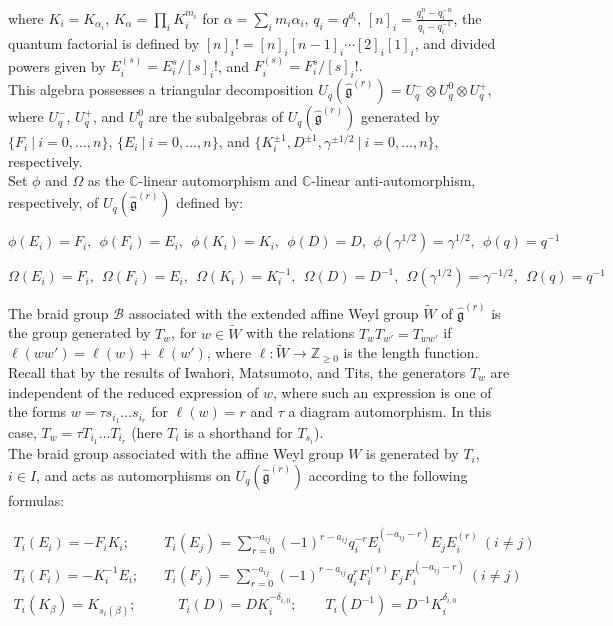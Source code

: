 \documentclass[12pt]{amsart}
\numberwithin{equation}{section}
\newcommand{\Z}{\ensuremath{\mathbb{Z}}}
\newcommand{\C}{\ensuremath{\mathbb{C}}}
\newcommand{\g}{\ensuremath{\mathfrak{g}}}
\newcommand{\mc}[1]{\mathcal{#1}}
\begin{document}
where $K_i=K_{\alpha_i}$, $K_{\alpha} = \prod_i K_i^{m_i}$ for $\alpha = \sum_i m_i\alpha_i$, $q_i = q^{d_i}$, $[n]_i=\frac{q_i^n - q_i^{-n}}{q_i-q_i^{-1}}$, the quantum factorial is defined by $[n]_i!=[n]_i[n-1]_i\cdots [2]_i[1]_i$, and divided powers given by $E_i^{(s)} = E_i^{s}/[s]_i!$, and $F_i^{(s)} = F_i^{s}/[s]_i!.$\\ 

This algebra possesses a triangular decomposition $U_q(\hat{\g}^{(r)}) = U_q^{-}\otimes U_q^0 \otimes U_q^{+}$, where $U_q^{-}$, $U_q^{+}$, and $U_q^0$ are the subalgebras of $U_q(\hat{\g}^{(r)})$ generated by $\{F_i \ |\ i=0, \ldots, n\}$, $\{E_i \ |\ i=0, \ldots, n\}$, and $\{K_i^{\pm 1}, D^{\pm 1}, \gamma^{\pm 1/2} \ |\ i=0, \ldots, n\}$, respectively. \\

Set $\phi$ and $\Omega$ as the $\C$-linear automorphism and $\C$-linear anti-automorphism, respectively, of $U_q(\hat{\g}^{(r)})$ defined by: 

$$ \phi(E_i) = F_i, \ \ \phi(F_i) = E_i, \ \ \phi(K_i) = K_i, \ \ \phi(D) = D,\ \, \phi(\gamma^{1/2}) = \gamma^{1/2}, \ \ \phi(q) = q^{-1}$$

$$ \Omega(E_i) = F_i, \ \ \Omega(F_i) = E_i, \ \ \Omega(K_i) = K_i^{-1}, \ \ \Omega(D) = D^{-1}, \ \ \Omega(\gamma^{1/2}) = \gamma^{-1/2}, \ \  \Omega(q) = q^{-1}$$

\vspace{3mm}

The braid group $\mc{B}$ associated with the extended affine Weyl group $\tilde{W}$ of $\hat{\g}^{(r)}$ is the group generated by $T_w$, for $w \in \tilde{W}$ with the relations $T_{w}T_{w'} = T_{ww'}$ if $\ell(ww') = \ell(w) + \ell(w')$, where $\ell : \tilde{W} \to \Z_{\geq 0}$ is the length function. Recall that by the results of Iwahori, Matsumoto, and Tits, the generators $T_w$ are independent of the reduced expression of $w$, where such an expression is one of the forms $w=\tau s_{i_1}\ldots s_{i_r}$ for $\ell(w)=r$ and $\tau$ a diagram automorphism. In this case, $T_w = \tau T_{i_1}\ldots T_{i_r}$ (here $T_{i}$ is a shorthand for $T_{s_i}$).\\

The braid group associated with the affine Weyl group $W$ is generated by $T_i$, $i\in I$, and acts as automorphisms on $U_q(\hat{\g}^{(r)})$ according to the following formulas: 

\begin{align*}
    T_i(E_i) = -F_iK_i; & \quad T_i(E_j) = \sum_{r=0}^{-a_{ij}} (-1)^{r-a_{ij}}q_i^{-r} E_i^{(-a_{ij}-r)}E_jE_i^{(r)} \ (i\neq j) \\
    T_i(F_i) = -K_i^{-1}E_i; & \quad T_i(F_j) = \sum_{r=0}^{-a_{ij}} (-1)^{r-a_{ij}}q_i^{r} F_i^{(r)}F_jF_i^{(-a_{ij}-r)} \ (i \neq j)\\
    T_i(K_{\beta}) = K_{s_i(\beta)}; & \quad \quad T_i(D) = DK_i^{-\delta_{i,0}}; \quad \quad T_i(D^{-1}) = D^{-1}K_i^{\delta_{i,0}}
\end{align*}
\end{document}
